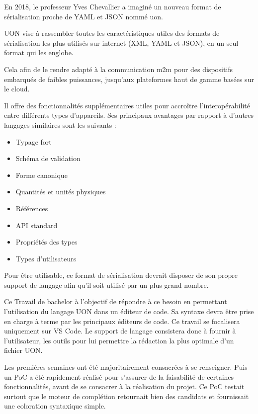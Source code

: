 
En 2018, le professeur Yves Chevallier a imaginé un nouveau format de sérialisation proche de YAML et JSON nommé \Gls{uon}.

UON vise à rassembler toutes les caractéristiques utiles des formats de sérialisation les plus utilisés sur internet (XML, YAML et JSON),
en un seul format qui les englobe.

Cela afin de le rendre adapté à la communication \Gls{m2m} pour des dispositifs embarqués de faibles puissances, jusqu'aux plateformes haut de gamme basées sur le cloud.

Il offre des fonctionnalités supplémentaires utiles pour accroître l'interopérabilité entre différents types d'appareils. Ses principaux avantages par rapport à d'autres langages similaires sont les suivants :

\begin{itemize}
    \item Typage fort
    \item Schéma de validation
    \item Forme canonique
    \item Quantités et unités physiques
    \item Références
    \item API standard
    \item Propriétés des types
    \item Types d'utilisateurs
\end{itemize}

Pour être utilisable, ce format de sérialisation devrait disposer de son propre support de langage afin qu'il soit utilisé par un plus grand nombre.

Ce Travail de bachelor à l'objectif de répondre à ce besoin en permettant l'utilisation du langage UON dans un éditeur de code.
Sa syntaxe devra être prise en charge à terme par les principaux éditeurs de code. Ce travail se focalisera uniquement sur VS Code.
Le support de langage consistera donc à fournir à l'utilisateur, les outils pour lui permettre la rédaction la plus optimale d'un fichier UON.

Les premières semaines ont été majoritairement consacrées à se renseigner.
Puis un \Gls{PoC} a été rapidement réalisé pour s'assurer de la faisabilité de certaines fonctionnalités, avant de se consacrer à la réalisation du projet.
Ce PoC testait surtout que le moteur de complétion retournait bien des candidats et fournissait une coloration syntaxique simple.

